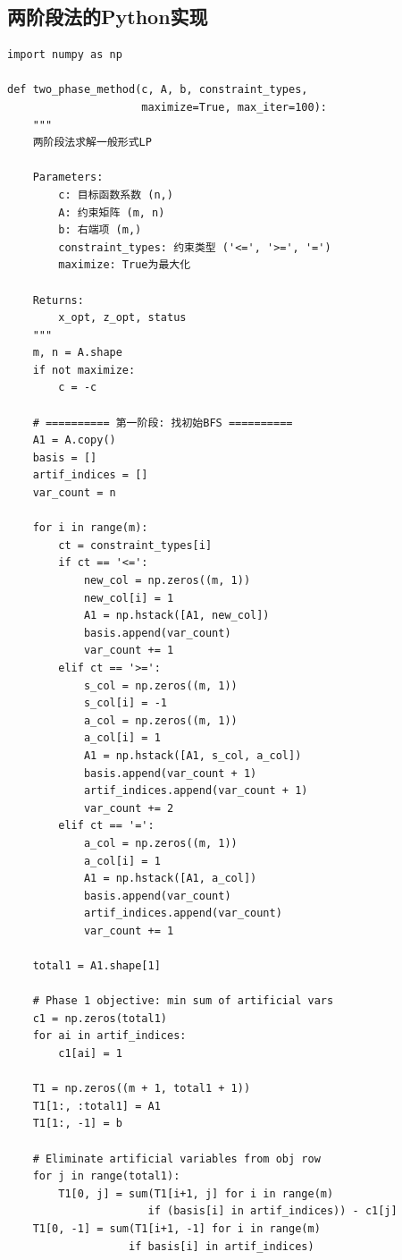 \subsection{两阶段法的Python实现}\label{sec:twophase-code}

\begin{codebox}[两阶段法实现]
\begin{lstlisting}
import numpy as np

def two_phase_method(c, A, b, constraint_types,
                     maximize=True, max_iter=100):
    """
    两阶段法求解一般形式LP
    
    Parameters:
        c: 目标函数系数 (n,)
        A: 约束矩阵 (m, n)
        b: 右端项 (m,)
        constraint_types: 约束类型 ('<=', '>=', '=')
        maximize: True为最大化
    
    Returns:
        x_opt, z_opt, status
    """
    m, n = A.shape
    if not maximize:
        c = -c
    
    # ========== 第一阶段: 找初始BFS ==========
    A1 = A.copy()
    basis = []
    artif_indices = []
    var_count = n
    
    for i in range(m):
        ct = constraint_types[i]
        if ct == '<=':
            new_col = np.zeros((m, 1))
            new_col[i] = 1
            A1 = np.hstack([A1, new_col])
            basis.append(var_count)
            var_count += 1
        elif ct == '>=':
            s_col = np.zeros((m, 1))
            s_col[i] = -1
            a_col = np.zeros((m, 1))
            a_col[i] = 1
            A1 = np.hstack([A1, s_col, a_col])
            basis.append(var_count + 1)
            artif_indices.append(var_count + 1)
            var_count += 2
        elif ct == '=':
            a_col = np.zeros((m, 1))
            a_col[i] = 1
            A1 = np.hstack([A1, a_col])
            basis.append(var_count)
            artif_indices.append(var_count)
            var_count += 1
    
    total1 = A1.shape[1]
    
    # Phase 1 objective: min sum of artificial vars
    c1 = np.zeros(total1)
    for ai in artif_indices:
        c1[ai] = 1
    
    T1 = np.zeros((m + 1, total1 + 1))
    T1[1:, :total1] = A1
    T1[1:, -1] = b
    
    # Eliminate artificial variables from obj row
    for j in range(total1):
        T1[0, j] = sum(T1[i+1, j] for i in range(m)
                      if (basis[i] in artif_indices)) - c1[j]
    T1[0, -1] = sum(T1[i+1, -1] for i in range(m)
                   if basis[i] in artif_indices)
    

\end{lstlisting}
\end{codebox}
